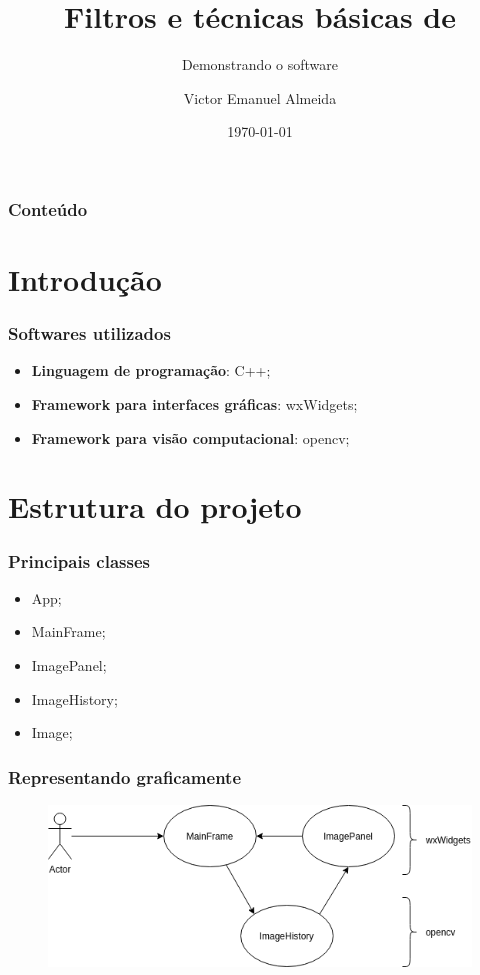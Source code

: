 \documentclass[12pt]{beamer}
\author[Aluno:~Victor E. Almeida]{Victor Emanuel Almeida}
\title{Filtros e técnicas básicas de \materia}
\subtitle{Demonstrando o software}
\date{\today}
\institute{UNIOESTE}
\begin{document}
\frame{\titlepage}

\begin{frame}
\frametitle{Conteúdo}
\tableofcontents
\end{frame}

\section{Introdução}\label{Introdução}
\begin{frame}
    \frametitle{Softwares utilizados}
    \begin{itemize}
    \item\textbf{Linguagem de programação}: C++;
    \item\textbf{Framework para interfaces gráficas}: wxWidgets\cite{docsWx};
    \item\textbf{Framework para visão computacional}: opencv\cite{docsCv};
    \end{itemize}
\end{frame}

\section{Estrutura do projeto}\label{Estrutura do projeto}
\begin{frame}
    \frametitle{Principais classes}
    \begin{itemize}
        \item App;
        \item MainFrame;
        \item ImagePanel;
        \item ImageHistory;
        \item Image;
    \end{itemize}
\end{frame}

\begin{frame}
    \frametitle{Representando graficamente}

    \begin{figure}
        \includegraphics[width=\linewidth]{flow.png}
    \end{figure}

\end{frame}
\end{document}
